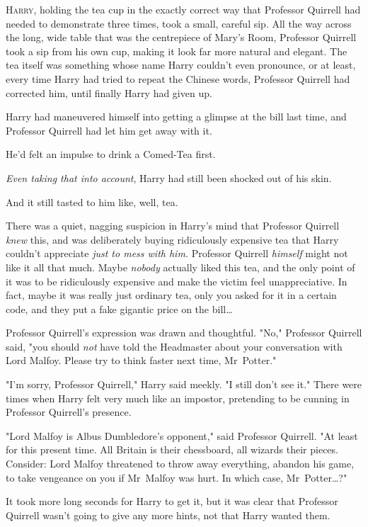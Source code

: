 
\lettrine{H}{arry}, holding
the tea cup in the exactly correct way that Professor Quirrell had needed to
demonstrate three times, took a small, careful sip. All the way across the
long, wide table that was the centrepiece of Mary's Room, Professor Quirrell
took a sip from his own cup, making it look far more natural and elegant. The
tea itself was something whose name Harry couldn't even pronounce, or at least,
every time Harry had tried to repeat the Chinese words, Professor Quirrell had
corrected him, until finally Harry had given up.

Harry had maneuvered himself into getting a glimpse at the bill last time, and
Professor Quirrell had let him get away with it.

He'd felt an impulse to drink a Comed-Tea first.

\emph{Even taking that into account}, Harry had still been shocked out of his
skin.

And it still tasted to him like, well, tea.

There was a quiet, nagging suspicion in Harry's mind that Professor Quirrell
\emph{knew} this, and was deliberately buying ridiculously expensive tea that
Harry couldn't appreciate \emph{just to mess with him.} Professor Quirrell
\emph{himself} might not like it all that much. Maybe \emph{nobody} actually
liked this tea, and the only point of it was to be ridiculously expensive and
make the victim feel unappreciative. In fact, maybe it was really just ordinary
tea, only you asked for it in a certain code, and they put a fake gigantic
price on the bill…

Professor Quirrell's expression was drawn and thoughtful. "No," Professor
Quirrell said, "you should \emph{not} have told the Headmaster about your
conversation with Lord Malfoy. Please try to think faster next time,
Mr~Potter."

"I'm sorry, Professor Quirrell," Harry said meekly. "I still don't see it."
There were times when Harry felt very much like an impostor, pretending to be
cunning in Professor Quirrell's presence.

"Lord Malfoy is Albus Dumbledore's opponent," said Professor Quirrell. "At
least for this present time. All Britain is their chessboard, all wizards their
pieces. Consider: Lord Malfoy threatened to throw away everything, abandon his
game, to take vengeance on you if Mr~Malfoy was hurt. In which case,
Mr~Potter…?"

It took more long seconds for Harry to get it, but it was clear that Professor
Quirrell wasn't going to give any more hints, not that Harry wanted them.

